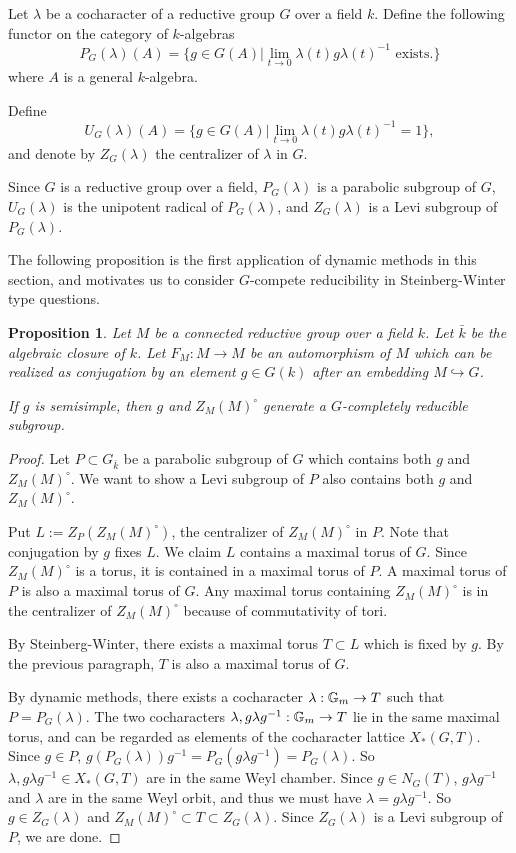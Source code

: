 \documentclass[10pt,a4paper,twoside]{article}
\newtheorem{prop}{Proposition}
\begin{document}
Let $\lambda$ be a cocharacter of a reductive group $G$ over a field $k$.
Define the following functor on the category of $k$-algebras
$$P_G(\lambda)(A)=\{g\in G(A)|\lim_{t\to 0}\lambda(t)g\lambda(t)^{-1}\text{~exists.}\}$$
where $A$ is a general $k$-algebra. 

Define $$U_G(\lambda)(A)=\{g\in G(A)|\lim_{t\to 0}\lambda(t)g\lambda(t)^{-1}=1\},$$
and denote by $Z_G(\lambda)$ the centralizer of $\lambda$ in $G$.

Since $G$ is a reductive group over a field, $P_G(\lambda)$ is a parabolic subgroup of $G$,
$U_G(\lambda)$ is the unipotent radical of $P_G(\lambda)$,
and $Z_G(\lambda)$ is a Levi subgroup of $P_G(\lambda)$.





The following proposition is the first application of dynamic methods in this section,
and motivates us to consider $G$-compete reducibility in Steinberg-Winter
type questions.

\begin{prop}
Let $M$ be a connected reductive group over a field $k$.
Let $\bar k$ be the algebraic closure of $k$.
Let $F_M : M\to M$ be an automorphism of $M$ which can be realized
as conjugation by an element $g\in G(k)$ after an embedding
$M \hookrightarrow G$.

If $g$ is semisimple, then
$g$ and $Z_M(M)^\circ$ generate a $G$-completely reducible subgroup.
\end{prop}

\begin{proof}
Let $P \subset G_{\bar k}$ be a parabolic subgroup of $G$ which
contains both $g$ and $Z_M(M)^\circ$.
We want to show a Levi subgroup of $P$
also contains both $g$ and $Z_M(M)^\circ$.

Put $L := Z_P(Z_M(M)^\circ)$, the centralizer of $Z_M(M)^\circ$
in $P$.
Note that conjugation by $g$ fixes $L$.
We claim $L$ contains a maximal torus of $G$.
Since $Z_M(M)^\circ$ is a torus, 
it is contained in a maximal torus of $P$.
A maximal torus of $P$ is also a maximal torus of $G$.
Any maximal torus containing $Z_M(M)^\circ$ 
is in the centralizer of $Z_M(M)^\circ$ because of commutativity of tori.

By Steinberg-Winter, there exists a maximal torus $T \subset L$
which is fixed by $g$. By the previous paragraph, $T$ is also a maximal torus
of $G$.


By dynamic methods, there exists a cocharacter $\lambda:\mathbb{G}_m \to T$
such that $P = P_G(\lambda)$.
The two cocharacters $\lambda, g\lambda g^{-1}: \mathbb{G}_m \to T$
lie in the same maximal torus, and can be regarded as elements of the
cocharacter lattice $X_*(G, T)$.
Since $g\in P$, $g(P_G(\lambda))g^{-1} = P_G(g\lambda g^{-1})=P_G(\lambda)$.
So $\lambda, g\lambda g^{-1} \in X_*(G,T)$ are in the same Weyl chamber.
Since $g \in N_G(T)$, $g \lambda g^{-1}$ and $\lambda$ are in the same Weyl orbit,
and thus we must have $\lambda = g \lambda g^{-1}$.
So $g \in Z_G(\lambda)$ and $Z_M(M)^\circ \subset T \subset Z_G(\lambda)$.
Since $Z_G(\lambda)$ is a Levi subgroup of $P$, we are done.
\end{proof}
\end{document}
